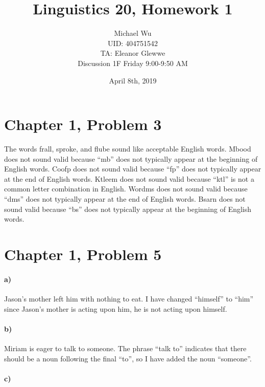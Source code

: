 \documentclass[12pt]{article}
\begin{document}
\title{Linguistics 20, Homework 1}
\date{April 8th, 2019}
\author{Michael Wu\\UID: 404751542\\TA: Eleanor Glewwe\\Discussion 1F Friday 9:00-9:50 AM}
\maketitle

\section*{Chapter 1, Problem 3}

The words frall, sproke, and flube sound like acceptable English words. Mbood does not sound valid
because ``mb'' does not typically appear at the beginning of English words. Coofp does not sound valid
because ``fp'' does not typically appear at the end of English words. Ktleem does not sound valid
because ``ktl'' is not a common letter combination in English. Wordms does not sound valid
because ``dms'' does not typically appear at the end of English words. Bsarn does not sound valid
because ``bs'' does not typically appear at the beginning of English words.

\section*{Chapter 1, Problem 5}

\paragraph{a)}

Jason's mother left him with nothing to eat. I have changed ``himself'' to ``him'' since Jason's mother
is acting upon him, he is not acting upon himself.

\paragraph{b)}

Miriam is eager to talk to someone. The phrase ``talk to'' indicates that there should be a noun following the
final ``to'', so I have added the noun ``someone''.

\paragraph{c)}
\end{document}
